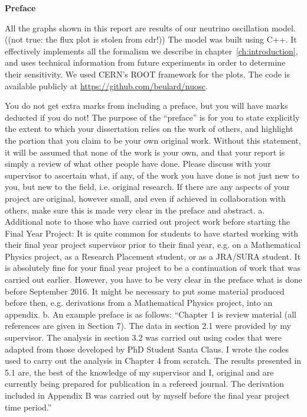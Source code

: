 \begin{center}

\vspace*{2cm} %
        
{\large\textbf{Preface}}
        
\vspace{1cm} %
\end{center}

All the graphs shown in this report are results of our neutrino oscillation
model. ((not true: the flux plot is stolen from cdr!))
The model was built using C++. It effectively implements all
the formalism we describe in chapter~\ref{ch:introduction}, and uses technical
information from future experiments in order to determine their sensitivity. 
We used CERN's ROOT framework\cite{ROOT} for the plots. The code is available
publicly at \href{url}{https://github.com/beulard/nuosc}.


You do not get extra marks from including a preface, but you will have marks
deducted if you do not! The purpose of the “preface” is for you to state
explicitly the extent to which your dissertation relies on the work of others,
and highlight the portion that you claim to be your own original work.  Without
this statement, it will be assumed that none of the work is your own, and that
your report is simply a review of what other people have done. Please discuss
with your supervisor to ascertain what, if any, of the work you have done is
not just new to you, but new to the field, i.e. original research. If there are
any aspects of your project are original, however small, and even if achieved
in collaboration with others, make sure this is made very clear in the preface
and abstract. 
a.	Additional note to those who have carried out project work before starting the Final Year Project: It is quite common for students to have started working with their final year project supervisor prior to their final year, e.g. on a Mathematical Physics project, as a Research Placement student, or as a JRA/SURA student. It is absolutely fine for your final year project to be a continuation of work that was carried out earlier. However, you have to be very clear in the preface what is done before September 2016. It might be necessary to put some material produced before then, e.g. derivations from a Mathematical Physics project, into an appendix.
b.	An example preface is as follows: “Chapter 1 is review material (all references are given in Section 7). The data in section 2.1 were provided by my supervisor.  The analysis in section 3.2 was carried out using codes that were adapted from those developed by PhD Student Santa Claus. I wrote the codes used to carry out the analysis in Chapter 4 from scratch. The results presented in 5.1 are, the best of the knowledge of my supervisor and I, original and are currently being prepared for publication in a refereed journal. The derivation included in Appendix B was carried out by myself before the final year project time period.” 

